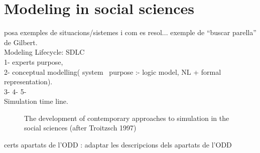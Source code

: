 \documentclass{report}
\begin{document}
\section{Modeling in social sciences}
\label{sec:modelsinSC}

posa exemples de situacions/sistemes i com es resol... exemple de ``buscar parella'' de Gilbert.
\\
Modeling Lifecycle: SDLC\\ 
1- experts purpose,\\
2- conceptual modelling( system \ purpose :- logic model, NL + formal representation).\\
3- 
4- 
5- 
\\
Simulation time line.\\
\begin{figure}[tp]
\setlength\fboxsep{0pt}
\setlength\fboxrule{0.5pt}
\caption{The development of contemporary approaches to simulation in the social sciences (after Troitzsch 1997)}
\label{fig:SimTL}
\end{figure}

certs apartats de l'ODD : adaptar les descripcions dels apartats de l'ODD


\end{document}
